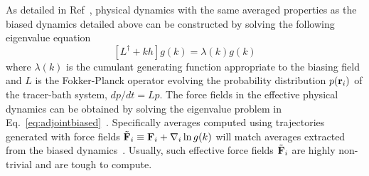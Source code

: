 \documentclass[pre,amsmath,preprintnumbers,10pt,article,notitlepage,twocolumn]{revtex4-1}
\begin{document}
As detailed in Ref~\cite{Chetrite2013}, physical dynamics with the same averaged properties as the biased dynamics detailed above can be constructed by solving the following eigenvalue equation 
\begin{equation}
\left[L^\dagger+k h\right]g(k)=\lambda(k) g(k)
\label{eq:adjointbiased}
\end{equation}
where $\lambda(k)$ is the cumulant generating function appropriate to the biasing field and $L$ is the Fokker-Planck operator evolving the probability distribution $p({\bf r}_i)$ of the tracer-bath system, $dp/dt = L p$. The force fields in the effective physical dynamics can be obtained by solving the eigenvalue problem in Eq.~\ref{eq:adjointbiased}~\cite{Chetrite2013}. Specifically averages computed using trajectories generated with force fields $\tilde {\bf F}_i \equiv {\bf F}_i + \nabla_i \ln g(k)$ will match averages extracted from the biased dynamics~\cite{Chetrite2013}. Usually, such effective force fields $\tilde {\bf F}_i$ are highly non-trivial and are tough to compute. 
\end{document}
